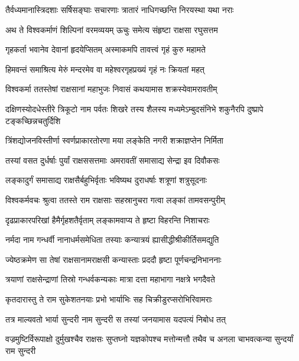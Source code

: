 \twolineshloka
{तैर्वध्यमानास्त्रिदशाः सर्षिसङ्घाः सचारणाः}
{त्रातारं नाधिगच्छन्ति निरयस्था यथा नराः} %

\twolineshloka
{अथ ते विश्वकर्माणं शिल्पिनां वरमव्ययम्}
{ऊचुः समेत्य संहृष्टा राक्षसा रघुसत्तम} %

\twolineshloka
{गृहकर्ता भवानेव देवानां हृदयेप्सितम्}
{अस्माकमपि तावत्त्वं गृहं कुरु महामते} %

\twolineshloka
{हिमवन्तं समाश्रित्य मेरुं मन्दरमेव वा}
{महेश्वरगृहप्रख्यं गृहं नः क्रियतां महत्} %

\twolineshloka
{विश्वकर्मा ततस्तेषां राक्षसानां महाभुजः}
{निवासं कथयामास शक्रस्येवामरावतीम्} %

\threelineshloka
{दक्षिणस्योदधेस्तीरे त्रिकूटो नाम पर्वतः}
{शिखरे तस्य शैलस्य मध्यमेऽम्बुदसंनिभे}
{शकुनैरपि दुष्प्रापे टङ्कच्छिन्नचतुर्दिशि} %

\twolineshloka
{त्रिंशद्योजनविस्तीर्णा स्वर्णप्राकारतोरणा}
{मया लङ्केति नगरी शक्राज्ञप्तेन निर्मिता} %

\twolineshloka
{तस्यां वसत दुर्धर्षाः पुर्यां राक्षससत्तमाः}
{अमरावतीं समासाद्य सेन्द्रा इव दिवौकसः} %

\twolineshloka
{लङ्कादुर्गं समासाद्य राक्षसैर्बहुभिर्वृताः}
{भविष्यथ दुराधर्षाः शत्रूणां शत्रुसूदनाः} %

\twolineshloka
{विश्वकर्मवचः श्रुत्वा ततस्ते राम राक्षसाः}
{सहस्रानुचरा गत्वा लङ्कां तामवसन्पुरीम्} %

\twolineshloka
{दृढप्राकारपरिखां हैमैर्गृहशतैर्वृताम्}
{लङ्कामवाप्य ते हृष्टा विहरन्ति निशाचराः} %

\twolineshloka
{नर्मदा नाम गन्धर्वी नानाधर्मसमेधिता}
{तस्याः कन्यात्रयं ह्यासीद्धीश्रीकीर्तिसमद्युति} %

\twolineshloka
{ज्येष्ठक्रमेण सा तेषां राक्षसानामराक्षसी}
{कन्यास्ताः प्रददौ हृष्टा पूर्णचन्द्रनिभाननाः} %

\twolineshloka
{त्रयाणां राक्षसेन्द्राणां तिस्रो गन्धर्वकन्यकाः}
{मात्रा दत्ता महाभागा नक्षत्रे भगदैवते} %

\twolineshloka
{कृतदारास्तु ते राम सुकेशतनयाः प्रभो}
{भार्याभिः सह चिक्रीडुरप्सरोभिरिवामराः} %

\twolineshloka
{तत्र माल्यवतो भार्या सुन्दरी नाम सुन्दरी}
{स तस्यां जनयामास यदपत्यं निबोध तत्} %

\threelineshloka
{वज्रमुष्टिर्विरूपाक्षो दुर्मुखश्चैव राक्षसः}
{सुप्तघ्नो यज्ञकोपश्च मत्तोन्मत्तौ तथैव च}
{अनला चाभवत्कन्या सुन्दर्यां राम सुन्दरी} %

